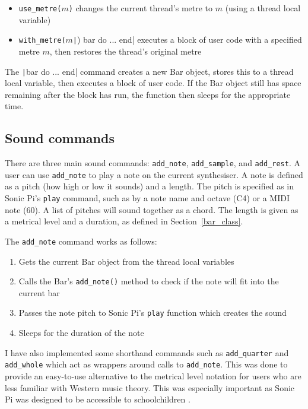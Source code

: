 \documentclass[12pt,twoside,openright]{report}
\begin{document}
\begin{itemize}
	\item \verb'use_metre('$m$\verb')' changes the current thread's metre to $m$ (using a thread local variable)
	\item \verb'with_metre('$m$\texttt|) bar do ... end| executes a block of user code with a
specified metre $m$, then restores the thread's original metre
\end{itemize}

The \texttt|bar do ... end| command creates a new Bar object, stores this to a
thread local variable, then executes a block of user code. If the Bar object
still has space remaining after the block has run, the function then sleeps for
the appropriate time.


\subsection{Sound commands} \label{sound_commands}

There are three main sound commands: \verb'add_note', \verb'add_sample', and \verb'add_rest'. A
user can use \verb'add_note' to play a note on the current synthesiser. A note is
defined as a pitch (how high or low it sounds) and a length. The pitch is
specified as in Sonic Pi's \verb'play' command, such as by a note name and octave (C4)
or a MIDI note (60). A list of pitches will sound together as a chord. The
length is given as a metrical level and a duration, as defined in Section~\ref{bar_class}.

The \verb'add_note' command works as follows:
\begin{enumerate}
    \item Gets the current Bar object from the thread local variables
    \item Calls the Bar's \verb'add_note()' method to check if the note will fit into the current bar
    \item Passes the note pitch to Sonic Pi's \verb'play' function which creates the sound
    \item Sleeps for the duration of the note
\end{enumerate}

I have also implemented some shorthand commands such as \verb'add_quarter' and
\verb'add_whole' which act as wrappers around calls to \verb'add_note'. This was done to
provide an easy-to-use alternative to the metrical level notation for users who
are less familiar with Western music theory. This was especially important as
Sonic Pi was designed to be accessible to schoolchildren \cite{aaron2013}.
\end{document}

